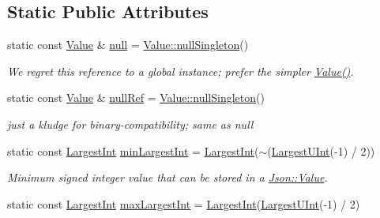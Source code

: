 \subsection*{Static Public Attributes}
\begin{DoxyCompactItemize}
\item 
static const \hyperlink{classJson_1_1Value}{Value} \& \hyperlink{classJson_1_1Value_a21ddb05b92c60c7548e928bf371e7d45_a21ddb05b92c60c7548e928bf371e7d45}{null} = \hyperlink{classJson_1_1Value_af2f124567acc35d021a424e53ebdfcab_af2f124567acc35d021a424e53ebdfcab}{Value\+::null\+Singleton}()
\begin{DoxyCompactList}\small\item\em We regret this reference to a global instance; prefer the simpler \hyperlink{classJson_1_1Value_ada6ba1369448fb0240bccc36efaa46f7_ada6ba1369448fb0240bccc36efaa46f7}{Value()}. \end{DoxyCompactList}\item 
static const \hyperlink{classJson_1_1Value}{Value} \& \hyperlink{classJson_1_1Value_aaee27e622f87266f861216d644603730_aaee27e622f87266f861216d644603730}{null\+Ref} = \hyperlink{classJson_1_1Value_af2f124567acc35d021a424e53ebdfcab_af2f124567acc35d021a424e53ebdfcab}{Value\+::null\+Singleton}()
\begin{DoxyCompactList}\small\item\em just a kludge for binary-\/compatibility; same as null \end{DoxyCompactList}\item 
static const \hyperlink{classJson_1_1Value_a1cbb82642ed05109b9833e49f042ece7_a1cbb82642ed05109b9833e49f042ece7}{Largest\+Int} \hyperlink{classJson_1_1Value_af91df130daa50dd43d2cd89e6ee67706_af91df130daa50dd43d2cd89e6ee67706}{min\+Largest\+Int} = \hyperlink{classJson_1_1Value_a1cbb82642ed05109b9833e49f042ece7_a1cbb82642ed05109b9833e49f042ece7}{Largest\+Int}($\sim$(\hyperlink{classJson_1_1Value_a6682a3684d635e03fc06ba229fa24eec_a6682a3684d635e03fc06ba229fa24eec}{Largest\+U\+Int}(-\/1) / 2))
\begin{DoxyCompactList}\small\item\em Minimum signed integer value that can be stored in a \hyperlink{classJson_1_1Value}{Json\+::\+Value}. \end{DoxyCompactList}\item 
static const \hyperlink{classJson_1_1Value_a1cbb82642ed05109b9833e49f042ece7_a1cbb82642ed05109b9833e49f042ece7}{Largest\+Int} \hyperlink{classJson_1_1Value_a8b4977696f13296fa8755c7953fafb2f_a8b4977696f13296fa8755c7953fafb2f}{max\+Largest\+Int} = \hyperlink{classJson_1_1Value_a1cbb82642ed05109b9833e49f042ece7_a1cbb82642ed05109b9833e49f042ece7}{Largest\+Int}(\hyperlink{classJson_1_1Value_a6682a3684d635e03fc06ba229fa24eec_a6682a3684d635e03fc06ba229fa24eec}{Largest\+U\+Int}(-\/1) / 2)

\end{DoxyCompactItemize}
